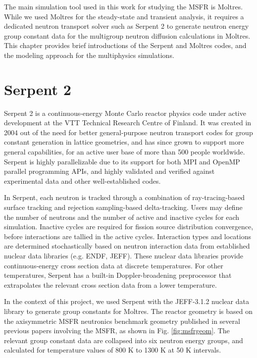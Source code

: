 The main simulation tool used in this work for studying the \gls{MSFR} is
Moltres. While we used Moltres for the steady-state and transient analysis, it
requires a dedicated neutron transport solver such as Serpent 2 to generate
neutron energy group constant data for the multigroup neutron diffusion
calculations in Moltres. This chapter provides brief introductions of the
Serpent and Moltres codes, and the modeling approach for the multiphysics
simulations.

\section{Serpent 2}

Serpent 2 \cite{leppanen_serpent_2014} is a continuous-energy Monte Carlo
reactor physics code under
active development at the VTT Technical Research Centre of Finland. It was
created in 2004 out of the need for better general-purpose neutron transport
codes for group constant generation in lattice geometries, and has since grown
to support more general capabilities, for an active user base of more than 500
people worldwide. Serpent is highly parallelizable due to its support for
both MPI and OpenMP parallel programming APIs, and highly validated and
verified against experimental data and other well-established codes.

In Serpent, each neutron is tracked through a combination of ray-tracing-based
surface tracking and rejection sampling-based delta-tracking. Users may define
the number of neutrons and the number of active and inactive cycles for each
simulation. Inactive cycles are required for fission source distribution
convergence, before interactions are tallied in the active cycles.
Interaction types and locations are
determined stochastically based on neutron interaction data from established
nuclear data libraries (e.g. ENDF, JEFF). These nuclear data libraries provide
continuous-energy cross section data at discrete temperatures. For other
temperatures, Serpent has a built-in Doppler-broadening preprocessor that
extrapolates the relevant cross section data from a lower temperature. 

In the context of this project, we used Serpent with the JEFF-3.1.2 nuclear
data library \cite{oecd/nea_jeff-3.1.2_2014} to generate group constants
for Moltres. The reactor geometry is based on the axisymmetric \gls{MSFR}
neutronics benchmark geometry published in several previous papers involving
the \gls{MSFR}, as shown in Fig. \ref{fig:msfrgeom}. The relevant group
constant data are collapsed into six neutron energy groups, and calculated for
temperature values of 800 K to 1300 K at 50 K intervals.

